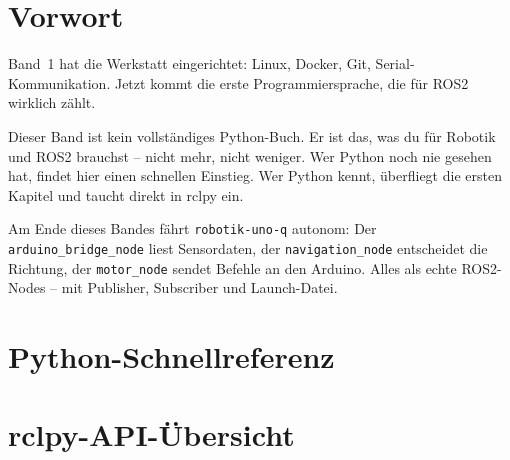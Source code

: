 \documentclass[12pt,a5paper]{book}
\newcommand{\BandVorwort}{%
Band~1 hat die Werkstatt eingerichtet: Linux, Docker, Git, Serial-Kommunikation.
Jetzt kommt die erste Programmiersprache, die für ROS2 wirklich zählt.

Dieser Band ist kein vollständiges Python-Buch.
Er ist das, was du für Robotik und ROS2 brauchst -- nicht mehr, nicht weniger.
Wer Python noch nie gesehen hat, findet hier einen schnellen Einstieg.
Wer Python kennt, überfliegt die ersten Kapitel und taucht direkt in rclpy ein.

Am Ende dieses Bandes fährt \texttt{robotik-uno-q} autonom:
Der \texttt{arduino\_bridge\_node} liest Sensordaten,
der \texttt{navigation\_node} entscheidet die Richtung,
der \texttt{motor\_node} sendet Befehle an den Arduino.
Alles als echte ROS2-Nodes -- mit Publisher, Subscriber und Launch-Datei.
}
\begin{document}


\frontmatter
\chapter*{Vorwort}
\BandVorwort
\newpage

\tableofcontents

\mainmatter






\backmatter
\appendix
\chapter{Python-Schnellreferenz}
\label{app:quickref}

\chapter{rclpy-API-Übersicht}
\label{app:rclpy}
\end{document}
